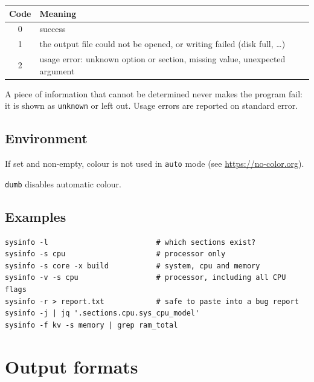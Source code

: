 \documentclass[11pt,a4paper]{article}
\begin{document}
\begin{center}
\begin{tabular}{@{}cl@{}}
\toprule
Code & Meaning \\
\midrule
0 & success \\
1 & the output file could not be opened, or writing failed (disk full, \dots) \\
2 & usage error: unknown option or section, missing value, unexpected argument \\
\bottomrule
\end{tabular}
\end{center}

A piece of information that cannot be determined never makes the program fail: it is shown as
\texttt{unknown} or left out. Usage errors are reported on standard error.

\subsection{Environment}

\begin{description}[style=nextline]
  \item[\texttt{NO\_COLOR}] If set and non-empty, colour is not used in \texttt{auto} mode
        (see \url{https://no-color.org}).
  \item[\texttt{TERM}] \texttt{dumb} disables automatic colour.
\end{description}

\subsection{Examples}

\begin{lstlisting}
sysinfo -l                         # which sections exist?
sysinfo -s cpu                     # processor only
sysinfo -s core -x build           # system, cpu and memory
sysinfo -v -s cpu                  # processor, including all CPU flags
sysinfo -r > report.txt            # safe to paste into a bug report
sysinfo -j | jq '.sections.cpu.sys_cpu_model'
sysinfo -f kv -s memory | grep ram_total
\end{lstlisting}

\section{Output formats}
\label{sec:formats}
\end{document}
